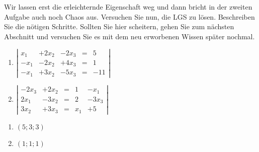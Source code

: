 \documentclass[12pt,a4paper,twoside,fleqn]{article}
\begin{document}
\begin{question}
  Wir lassen erst die erleichternde Eigenschaft weg und dann bricht in
  der zweiten Aufgabe auch noch Chaos aus. Versuchen Sie nun, die LGS
  zu lösen. Beschreiben Sie die nötigen Schritte. Sollten Sie hier
  scheitern, gehen Sie zum nächsten Abschnitt und versuchen Sie es mit
  dem neu erworbenen Wissen später nochmal.
  \begin{multicols}{2}
    \begin{enumerate}
    \item   
      $\left|
        \begin{array}{rllcl}
          x_1&+2x_2&-2x_3&=& 5\\
          -x_1&-2x_2&+4x_3&=& 1\\
          -x_1&+3x_2&-5x_3&=&-11
        \end{array}\right|$
    \item 
      $\left|
        \begin{array}{rlcll}
          -2x_3&+2x_2&=& 1 &-x_1\\
          2x_1&-3x_2&=& 2 &-3x_3\\
          3x_2&+3x_3&=&x_1&+5
        \end{array}\right|$
    \end{enumerate}
  \end{multicols}
\end{question}
\begin{solution}
  \begin{multicols}{4}
    \begin{enumerate}
    \item $(5;3;3)$
    \item $(1;1;1)$
    \end{enumerate}
  \end{multicols}
\end{solution}



\end{document}
